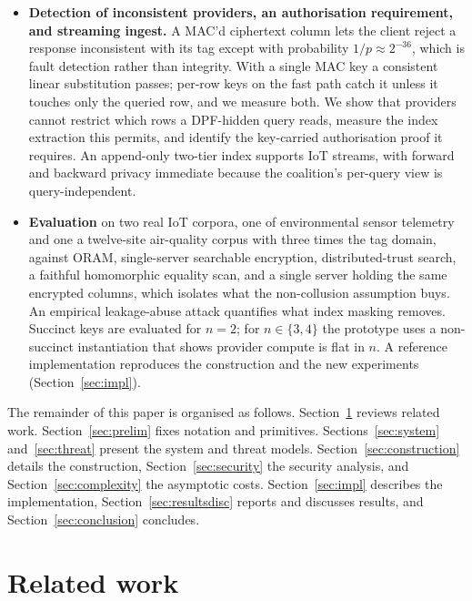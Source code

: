 \documentclass[a4paper,fleqn]{cas-sc}
\begin{document}
\begin{itemize}
\item \textbf{Detection of inconsistent providers, an authorisation
requirement, and streaming ingest.} A MAC'd ciphertext column lets the client
reject a response inconsistent with its tag except with probability
$1/p\approx2^{-36}$, which is fault detection rather than integrity. With a
single MAC key a consistent linear substitution passes; per-row keys on the
fast path catch it unless it touches only the queried row, and we measure
both. We show that providers cannot
restrict which rows a DPF-hidden query reads, measure the index extraction
this permits, and identify the key-carried authorisation proof it requires. An
append-only two-tier index supports IoT streams, with forward and backward
privacy immediate because the coalition's per-query view is query-independent.

\item \textbf{Evaluation} on two real IoT corpora, one of environmental sensor
telemetry and one a twelve-site air-quality corpus with three times the tag
domain, against ORAM, single-server searchable encryption, distributed-trust
search, a faithful homomorphic equality scan, and a single server holding
the same encrypted columns, which isolates what the non-collusion assumption
buys. An empirical leakage-abuse attack quantifies what index masking removes.
Succinct keys are evaluated for $n=2$; for $n\in\{3,4\}$ the prototype uses a
non-succinct instantiation that shows provider compute is flat in $n$. A
reference implementation reproduces the construction and the new experiments
(Section~\ref{sec:impl}).
\end{itemize}

The remainder of this paper is organised as follows.
Section~\ref{sec:related} reviews related work. Section~\ref{sec:prelim} fixes
notation and primitives. Sections~\ref{sec:system} and~\ref{sec:threat}
present the system and threat models. Section~\ref{sec:construction} details
the construction, Section~\ref{sec:security} the security analysis, and
Section~\ref{sec:complexity} the asymptotic costs. Section~\ref{sec:impl}
describes the implementation, Section~\ref{sec:resultsdisc} reports and
discusses results, and Section~\ref{sec:conclusion} concludes.

\section{Related work}
\label{sec:related}
\end{document}
